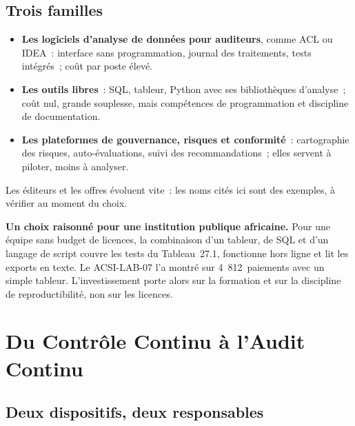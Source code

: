 \subsection{Trois familles}

\begin{itemize}
    \item \textbf{Les logiciels d'analyse de données pour auditeurs}, comme
          ACL ou IDEA~: interface sans programmation, journal des
          traitements, tests intégrés~; coût par poste élevé.
    \item \textbf{Les outils libres}~: SQL, tableur, Python avec ses
          bibliothèques d'analyse~; coût nul, grande souplesse, mais
          compétences de programmation et discipline de documentation.
    \item \textbf{Les plateformes de gouvernance, risques et conformité}~:
          cartographie des risques, auto-évaluations, suivi des
          recommandations~; elles servent à piloter, moins à analyser.
\end{itemize}
Les éditeurs et les offres évoluent vite~: les noms cités ici sont des
exemples, à vérifier au moment du choix.

\begin{boxinfo}
\textbf{Un choix raisonné pour une institution publique africaine.} Pour
une équipe sans budget de licences, la combinaison d'un tableur, de SQL et
d'un langage de script couvre les tests du Tableau~27.1, fonctionne hors
ligne et lit les exports en texte. Le ACSI-LAB-07 l'a montré sur
4~812~paiements avec un simple tableur. L'investissement porte alors sur la
formation et sur la discipline de reproductibilité, non sur les licences.
\end{boxinfo}

\section{Du Contrôle Continu à l'Audit Continu}
\label{sec:c27-continu}

\subsection{Deux dispositifs, deux responsables}

